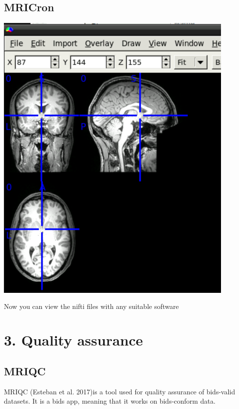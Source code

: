 \documentclass[
  letterpaper,
]{report}
\begin{document}
\section{MRICron}\label{mricron}

\includegraphics[width=4.64583in,height=\textheight,keepaspectratio]{images/clipboard-2244027224.png}

Now you can view the nifti files with any suitable software


\chapter{3. Quality assurance}\label{quality-assurance}

\section{MRIQC}\label{mriqc}

MRIQC (Esteban et al. 2017)is a tool used for quality assurance of
bids-valid datasets. It is a bids app, meaning that it works on
bids-conform data.
\end{document}
